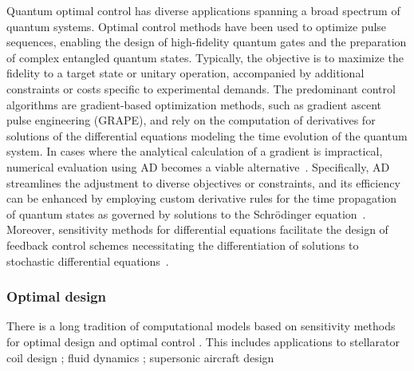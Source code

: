 Quantum optimal control has diverse applications spanning a broad spectrum of quantum systems. 
Optimal control methods have been used to optimize pulse sequences, enabling the design of high-fidelity quantum gates and the preparation of complex entangled quantum states. 
Typically, the objective is to maximize the fidelity to a target state or unitary operation, accompanied by additional constraints or costs specific to experimental demands. 
The predominant control algorithms are gradient-based optimization methods, such as gradient ascent pulse engineering (GRAPE), and rely on the computation of derivatives for solutions of the differential equations modeling the time evolution of the quantum system. 
In cases where the analytical calculation of a gradient is impractical, numerical evaluation using AD becomes a viable alternative~\cite{jirari:2009, leung:2017, abdelhafez:2019, jirari2019quantum, abdelhafez:2020, schaefer:2020, goerz:2022}. 
Specifically, AD streamlines the adjustment to diverse objectives or constraints, and its efficiency can be enhanced by employing custom derivative rules for the time propagation of quantum states as governed by solutions to the Schrödinger equation~\cite{goerz:2022}. 
Moreover, sensitivity methods for differential equations facilitate the design of feedback control schemes necessitating the differentiation of solutions to stochastic differential equations~\cite{schaefer:2021}.

\subsubsection{Optimal design}

There is a long tradition of computational models based on sensitivity methods for optimal design and optimal control \cite{lions1971optimal, pironneau2005optimal, allaire2014shape}.
This includes applications to 
stellarator coil design \cite{McGreivy_stellarator_2021}; 
fluid dynamics \cite{Giles_Pierce_2000, mohammadi2009applied};
supersonic aircraft design \cite{
hu2010supersonic, fike2013multi}


